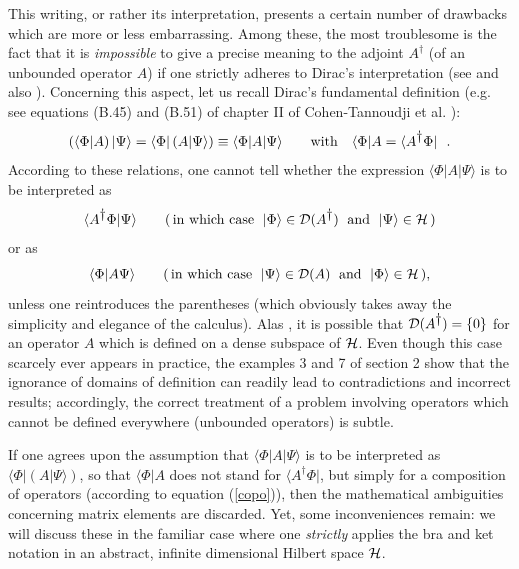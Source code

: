 \documentclass[a4wide,12pt]{report}
\begin{document}
This writing, or rather its interpretation, 
presents a certain number of drawbacks 
which are more or less embarrassing. 
Among these, the most troublesome is the fact that it is 
{\em impossible} to give a precise meaning to the adjoint 
$A^{\dag}$ (of an unbounded operator $A$) if one strictly adheres
to Dirac's interpretation (see \cite{grau} and also \cite{fano}).
Concerning this aspect, let us recall Dirac's fundamental definition 
(e.g. see equations (B.45)
and (B.51) of chapter II of Cohen-Tannoudji et al. \cite{ct}):
\begin{equation}
\label{cohe}
\left( \langle \Phi | A \right) | \Psi \rangle =
\langle \Phi | \left( A  | \Psi \rangle \right) \equiv
\langle \Phi |  A  | \Psi \rangle
\qquad {\rm with} \quad
\langle \Phi | A  = \langle A^{\dag} \Phi |
\ \ .
\end{equation}
According to these relations, one cannot tell whether 
the expression 
$\langle \Phi |  A  | \Psi \rangle$ 
is to be interpreted as
\[
\langle  A^{\dag} \Phi | \Psi \rangle
\qquad
(\, \mbox{in which case} \ \; |\Phi \rangle \in {\cal D} (A^{\dag})
\ \; {\rm and} \ \; | \Psi \rangle \in \hs \, )
\]
or as 
\[
\langle \Phi | A   \Psi \rangle
\qquad
(\, \mbox{in which case} \ \; |\Psi \rangle \in {\cal D} (A) \
\; {\rm and} \ \; | \Phi \rangle \in \hs \, ),
\]
unless one reintroduces the parentheses (which obviously 
takes away the simplicity and elegance of the calculus). 
Alas \cite{rs}, it is possible that 
${\cal D}(A^{\dag}) = \{ 0 \}$
for an operator $A$ which is defined on a dense subspace of $\hs$.
Even though this case scarcely ever appears in practice, 
the examples 3
and 7 of section 2 show that the ignorance of
domains of definition can 
readily lead to contradictions and incorrect results; 
accordingly, the 
correct treatment of a problem involving operators 
which cannot be defined everywhere (unbounded operators)
is subtle. 

If one agrees upon the assumption that  
$\langle \Phi |  A  | \Psi \rangle$ 
 is to be interpreted as 
$\langle \Phi | \left( A  | \Psi \rangle \right)$, so that 
$\langle \Phi |A$ does not stand for $\langle A^{\dag} \Phi |$, 
but simply for a composition of operators
(according to equation (\ref{copo})), 
then the mathematical ambiguities concerning matrix elements are 
discarded. Yet, some 
inconveniences remain: 
we will discuss these in the 
familiar case where one {\em strictly} 
applies the bra and ket notation 
in an abstract, infinite dimensional Hilbert space $\hs$. 
 
\end{document}

